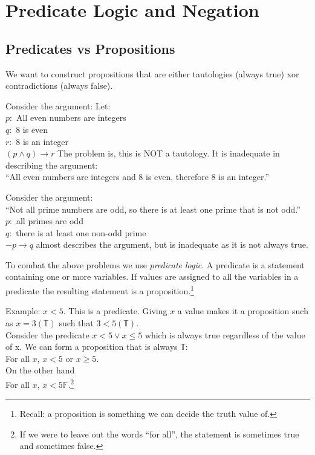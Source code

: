 \section{Predicate Logic and Negation}
\label{sec:PredicateLogicAndNegation}

\subsection{Predicates vs Propositions}
\label{sec:PredicatesVsPropositions}
We want to construct propositions that are either tautologies (always true) xor
contradictions (always false).

Consider the argument:
Let: \\
$p: $ All even numbers are integers\\
$q: $ 8 is even \\
$r: $ 8 is an integer \\
$(p \land q) \to r $
The problem is, this is NOT a tautology. It is inadequate in describing the
argument: \\
``All even numbers are integers and 8 is even, therefore 8 is an integer.''

Consider the argument: \\
``Not all prime numbers are odd, so there is at least one prime that is not
odd.''\\
$p: $ all primes are odd \\
$q: $ there is at least one non-odd prime \\
$-p \to q$ almost describes the argument, but is inadequate as it is not always
true.

To combat the above problems we use \emph{predicate logic}. A predicate is a
statement containing one or more variables. If values are assigned to all the
variables in a predicate the resulting statement is a
proposition.\footnote{Recall: a proposition is something we can decide the truth
value of.}

Example: $x < 5$. This is a predicate. Giving $x$ a value makes it a proposition
such as $x = 3 (\mathbb{T})$ such that $3 < 5 (\mathbb{T})$. \\
Consider the predicate $x < 5 \lor x \leq 5$ which is always true regardless of
the value of x.
We can form a proposition that is always $\mathbb{T}$:\\
For all $x$, $x<5$ or $x \geq 5$. \\
On the other hand \\
For all $x$, $x < 5 \mathbb{F}$.\footnote{If we were to leave out the
words ``for all'', the statement is sometimes true and sometimes false.}\\

